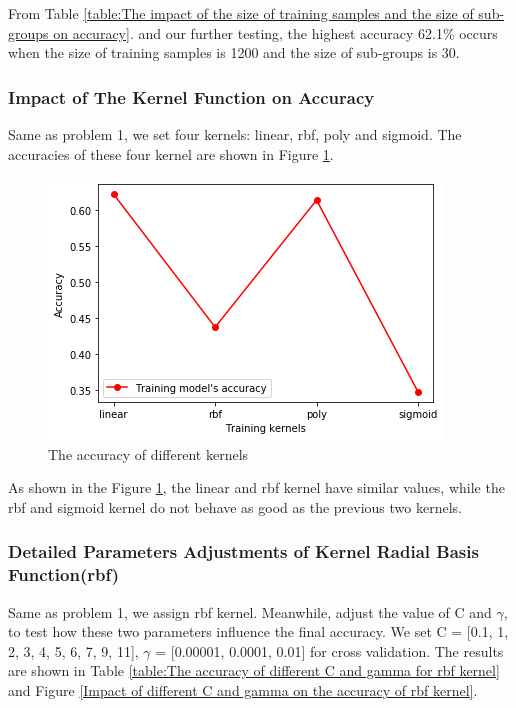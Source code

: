 From Table \ref{table:The impact of the size of training samples and the size of sub-groups on accuracy}. and our further testing, the highest accuracy 62.1\% occurs when the size of training samples is 1200 and the size of sub-groups is 30.

\subsubsection{Impact of The Kernel Function on Accuracy}
Same as problem 1, we set four kernels: linear, rbf, poly and sigmoid. The accuracies of these four kernel are shown in Figure \ref{fig:The accuracy of different kernels}.
\begin{figure}[h!]
    \centering
    \includegraphics[scale=0.6]{figures/The accuracy of different kernels.png}
    \caption{The accuracy of different kernels}
    \label{fig:The accuracy of different kernels}
\end{figure}


As shown in the Figure \ref{fig:The accuracy of different kernels}, the linear and rbf kernel have similar values, while the rbf and sigmoid kernel do not behave as good as the previous two kernels.

\subsubsection{Detailed Parameters Adjustments of Kernel Radial Basis Function(rbf)}
Same as problem 1, we assign rbf kernel. Meanwhile, adjust the value of C and $\gamma$, to test how these two parameters influence the final accuracy.
We set C =  [0.1, 1, 2, 3, 4, 5, 6, 7, 9, 11], $\gamma$ = [0.00001, 0.0001, 0.01] for cross validation.
The results are shown in Table \ref{table:The accuracy of different C and gamma for rbf kernel} and Figure \ref{Impact of different C and gamma on the accuracy of rbf kernel}. 

